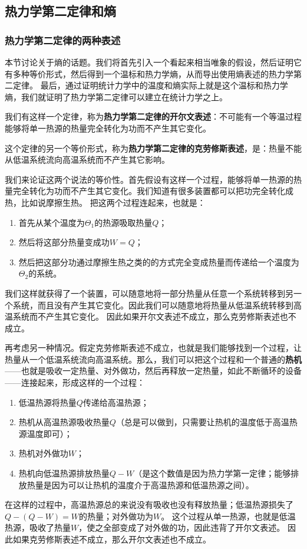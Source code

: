 \documentclass[hyperref, UTF8, a4paper]{ctexart}
\begin{document}
\subsection{热力学第二定律和熵}

\subsubsection{热力学第二定律的两种表述}

本节讨论关于熵的话题。我们将首先引入一个看起来相当唯象的假设，然后证明它有多种等价形式，然后得到一个温标和热力学熵，从而导出使用熵表述的热力学第二定律。
最后，通过证明统计力学中的温度和熵实际上就是这个温标和热力学熵，我们就证明了热力学第二定律可以建立在统计力学之上。

我们有这样一个定律，称为\textbf{热力学第二定律的开尔文表述}：不可能有一个等温过程能够将单一热源的热量完全转化为功而不产生其它变化。

这个定律的另一个等价形式，称为\textbf{热力学第二定律的克劳修斯表述}，是：热量不能从低温系统流向高温系统而不产生其它影响。

我们来论证这两个说法的等价性。首先假设有这样一个过程，能够将单一热源的热量完全转化为功而不产生其它变化。我们知道有很多装置都可以把功完全转化成热，比如说摩擦生热。
把这两个过程连起来，也就是：
\begin{enumerate}
    \item 首先从某个温度为$\Theta_1$的热源吸取热量$Q$；
    \item 然后将这部分热量变成功$W=Q$；
    \item 然后把这部分功通过摩擦生热之类的的方式完全变成热量而传递给一个温度为$\Theta_2$的系统。
\end{enumerate}
我们这样就获得了一个装置，可以随意地将一部分热量从任意一个系统转移到另一个系统，而且没有产生其它变化。因此我们可以随意地将热量从低温系统转移到高温系统而不产生其它变化。
因此如果开尔文表述不成立，那么克劳修斯表述也不成立。

再考虑另一种情况。假定克劳修斯表述不成立，也就是我们能够找到一个过程，让热量从一个低温系统流向高温系统。那么，我们可以把这个过程和一个普通的\textbf{热机}——也就是吸收一定热量、对外做功，然后再释放一定热量，如此不断循环的设备——连接起来，形成这样的一个过程：
\begin{enumerate}
    \item 低温热源将热量$Q$传递给高温热源；
    \item 热机从高温热源吸收热量$Q$（总是可以做到，只需要让热机的温度低于高温热源温度即可）；
    \item 热机对外做功$W$；
    \item 热机向低温热源排放热量$Q-W$（是这个数值是因为热力学第一定律；能够排放热量是因为可以让热机的温度介于高温热源和低温热源之间）。
\end{enumerate}
在这样的过程中，高温热源总的来说没有吸收也没有释放热量；低温热源损失了$Q-(Q-W)=W$的热量；对外做功为$W$。
这个过程从单一热源，也就是低温热源，吸收了热量$W$，使之全部变成了对外做的功，因此违背了开尔文表述。
因此如果克劳修斯表述不成立，那么开尔文表述也不成立。
\end{document}
